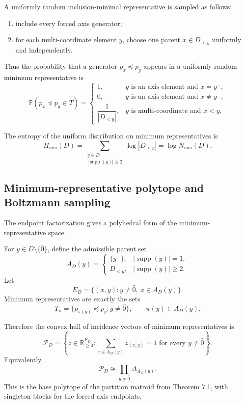 \documentclass[11pt]{article}
\begin{document}
A uniformly random inclusion-minimal representative is sampled as follows:
\begin{enumerate}
\item include every forced axis generator;
\item for each multi-coordinate element $y$, choose one parent $x\in D_{<y}$ uniformly and independently.
\end{enumerate}

Thus the probability that a generator $p_x\preceq p_y$ appears in a uniformly random minimum representative is
\[
\mathbb P(p_x\preceq p_y\in T)
=
\begin{cases}
1, & y\text{ is an axis element and }x=y^-,\\[4pt]
0, & y\text{ is an axis element and }x\ne y^-,\\[4pt]
\dfrac1{|D_{<y}|}, & y\text{ is multi-coordinate and }x<y.
\end{cases}
\]

The entropy of the uniform distribution on minimum representatives is
\[
H_{\min}(D)
=
\sum_{\substack{y\in D\\ |\operatorname{supp}(y)|\ge2}}
\log |D_{<y}|
=
\log N_{\min}(D).
\]

\subsection{Minimum-representative polytope and Boltzmann sampling}

The endpoint factorization gives a polyhedral form of the minimum-representative space.

For $y\in D\setminus\{\hat{0}\}$, define the admissible parent set
\[
A_D(y)=
\begin{cases}
\{y^-\}, & |\operatorname{supp}(y)|=1,\\[3pt]
D_{<y}, & |\operatorname{supp}(y)|\ge2.
\end{cases}
\]
Let
\[
E_D=\{(x,y):y\ne\hat{0},\ x\in A_D(y)\}.
\]
Minimum representatives are exactly the sets
\[
T_\pi=\{p_{\pi(y)}\preceq p_y:y\ne\hat{0}\},
\qquad
\pi(y)\in A_D(y).
\]

Therefore the convex hull of incidence vectors of minimum representatives is
\[
\mathcal P_D
=
\left\{
z\in\mathbb R_{\ge0}^{E_D}:
\sum_{x\in A_D(y)}z_{(x,y)}=1
\text{ for every }y\ne\hat{0}
\right\}.
\]
Equivalently,
\[
\mathcal P_D\cong
\prod_{y\ne\hat{0}}\Delta_{A_D(y)}.
\]
This is the base polytope of the partition matroid from Theorem 7.1, with singleton blocks for the forced axis endpoints.
\end{document}

